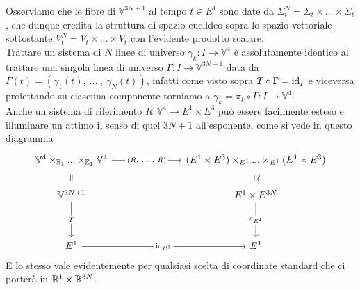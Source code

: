 \documentclass[openany]{book}
\renewcommand\V{\mathbb{V}}
\begin{document}
Osserviamo che le fibre di $\V^{3N+1}$ al tempo $t\in E^1$ sono date da $\Sigma_t^N = \Sigma_t\times...\times\Sigma_t$, che dunque eredita la struttura di spazio euclideo sopra lo spazio vettoriale sottostante $V_t^N = V_t\times...\times V_t$ con l'evidente prodotto scalare.\\
Trattare un sistema di $N$ linee di universo $\gamma_{k}:I\to\V^4$ è assolutamente identico al trattare una singola linea di universo $\Gamma :I\to\V^{3N+1}$ data da $\Gamma(t)=(\gamma_1(t),\ ...\ ,\ \gamma_N(t))$, infatti come visto sopra $T\circ \Gamma = \operatorname{id}_{I}$ e viceversa proiettando su ciascuna componente torniamo a $\gamma_k = \pi_k\circ \Gamma: I \to \V^4$.\\
Anche un sistema di riferimento $R:\V^4\to E^1\times E^3$ può essere facilmente esteso e illuminare un attimo il senso di quel $3N+1$ all'esponente, come si vede in questo diagramma 
\[\begin{tikzcd}
	{\V^4\times_{\E_1}...\times_{\E_1}\V^4} &&& {(E^1\times E^3)\times_{E^1}...\times_{E^1}(E^1\times E^3)} \\
	{\V^{3N+1}} &&& {E^1\times E^{3N}} \\
	\\
	{E^1} &&& {E^1}
	\arrow["{(R,\ ...\ ,\  R)}"{description}, from=1-1, to=1-4]
	\arrow["\cong"{marking, allow upside down}, draw=none, from=1-4, to=2-4]
	\arrow["{=}"{marking, allow upside down}, draw=none, from=2-1, to=1-1]
	\arrow["T"{description}, from=2-1, to=4-1]
	\arrow["{\pi_{E^1}}"{description}, from=2-4, to=4-4]
	\arrow["{\id_{E^1}}"{description}, from=4-1, to=4-4]
\end{tikzcd}\] 
E lo stesso vale evidentemente per qualsiasi scelta di coordinate standard che ci porterà in $\mathbb{R}^1\times\mathbb{R}^{3N}$.
\end{document}
